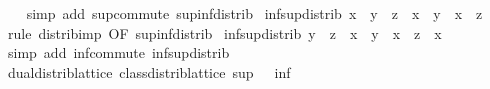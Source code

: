 \begin{isabellebody}
%
\isadelimproof
\ \ %
\endisadelimproof
%
\isatagproof
{}\isamarkupfalse%
\ {\isacharparenleft}{\kern0pt}simp\ add{\isacharcolon}{\kern0pt}\ sup{\isacharunderscore}{\kern0pt}commute\ sup{\isacharunderscore}{\kern0pt}inf{\isacharunderscore}{\kern0pt}distrib{}{\isacharparenright}{\kern0pt}%
\endisatagproof
{\isafoldproof}%
%
\isadelimproof
\isanewline
%
\endisadelimproof
\isanewline
{}\isamarkupfalse%
\ inf{\isacharunderscore}{\kern0pt}sup{\isacharunderscore}{\kern0pt}distrib{}{\isacharcolon}{\kern0pt}\ {\isachardoublequoteopen}x\ {\isasymsqinter}\ {\isacharparenleft}{\kern0pt}y\ {\isasymsqunion}\ z{\isacharparenright}{\kern0pt}\ {\isacharequal}{\kern0pt}\ {\isacharparenleft}{\kern0pt}x\ {\isasymsqinter}\ y{\isacharparenright}{\kern0pt}\ {\isasymsqunion}\ {\isacharparenleft}{\kern0pt}x\ {\isasymsqinter}\ z{\isacharparenright}{\kern0pt}{\isachardoublequoteclose}\isanewline
%
\isadelimproof
\ \ %
\endisadelimproof
%
\isatagproof
{}\isamarkupfalse%
\ {\isacharparenleft}{\kern0pt}rule\ distrib{\isacharunderscore}{\kern0pt}imp{}\ {\isacharbrackleft}{\kern0pt}OF\ sup{\isacharunderscore}{\kern0pt}inf{\isacharunderscore}{\kern0pt}distrib{}{\isacharbrackright}{\kern0pt}{\isacharparenright}{\kern0pt}%
\endisatagproof
{\isafoldproof}%
%
\isadelimproof
\isanewline
%
\endisadelimproof
\isanewline
{}\isamarkupfalse%
\ inf{\isacharunderscore}{\kern0pt}sup{\isacharunderscore}{\kern0pt}distrib{}{\isacharcolon}{\kern0pt}\ {\isachardoublequoteopen}{\isacharparenleft}{\kern0pt}y\ {\isasymsqunion}\ z{\isacharparenright}{\kern0pt}\ {\isasymsqinter}\ x\ {\isacharequal}{\kern0pt}\ {\isacharparenleft}{\kern0pt}y\ {\isasymsqinter}\ x{\isacharparenright}{\kern0pt}\ {\isasymsqunion}\ {\isacharparenleft}{\kern0pt}z\ {\isasymsqinter}\ x{\isacharparenright}{\kern0pt}{\isachardoublequoteclose}\isanewline
%
\isadelimproof
\ \ %
\endisadelimproof
%
\isatagproof
{}\isamarkupfalse%
\ {\isacharparenleft}{\kern0pt}simp\ add{\isacharcolon}{\kern0pt}\ inf{\isacharunderscore}{\kern0pt}commute\ inf{\isacharunderscore}{\kern0pt}sup{\isacharunderscore}{\kern0pt}distrib{}{\isacharparenright}{\kern0pt}%
\endisatagproof
{\isafoldproof}%
%
\isadelimproof
\isanewline
%
\endisadelimproof
\isanewline
{}\isamarkupfalse%
\ dual{\isacharunderscore}{\kern0pt}distrib{\isacharunderscore}{\kern0pt}lattice{\isacharcolon}{\kern0pt}\ {\isachardoublequoteopen}class{\isachardot}{\kern0pt}distrib{\isacharunderscore}{\kern0pt}lattice\ sup\ {\isacharparenleft}{\kern0pt}{\isasymge}{\isacharparenright}{\kern0pt}\ {\isacharparenleft}{\kern0pt}{\isachargreater}{\kern0pt}{\isacharparenright}{\kern0pt}\ inf{\isachardoublequoteclose}\isanewline

\end{isabellebody}
